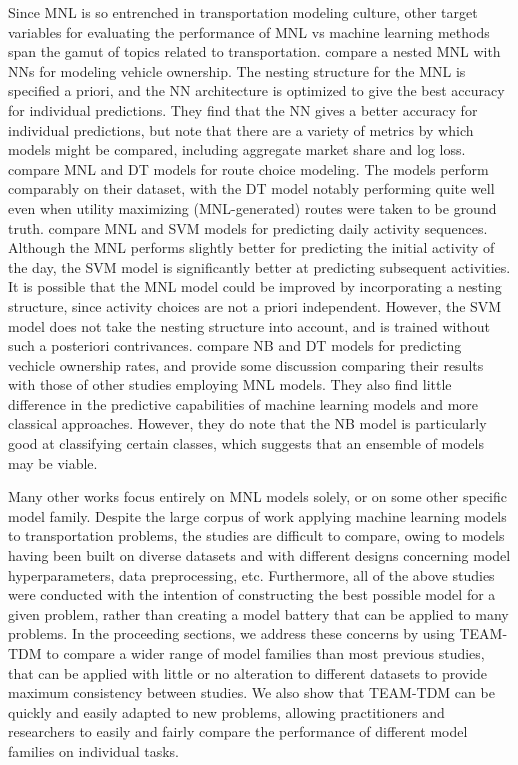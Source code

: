 \documentclass[conference]{IEEEtran}
\begin{document}
Since MNL is so entrenched in transportation modeling culture, other target variables for evaluating the performance of MNL vs machine learning methods span the gamut of topics related to transportation.
 \cite{mohammadian2002nested} compare a nested MNL with NNs for modeling vehicle ownership.
 The nesting structure for the MNL is specified a priori, and the NN architecture is optimized to give the best accuracy for individual predictions.
 They find that the NN gives a better accuracy for individual predictions, but note that there are a variety of metrics by which models might be compared, including aggregate market share and log loss.
 \cite{park2007learning} compare MNL and DT models for route choice modeling.
 The models perform comparably on their dataset, with the DT model notably performing quite well even when utility maximizing (MNL-generated) routes were taken to be ground truth.
 \cite{allahviranloo2013daily} compare MNL and SVM models for predicting daily activity sequences.
 Although the MNL performs slightly better for predicting the initial activity of the day, the SVM model is significantly better at predicting subsequent activities.
 It is possible that the MNL model could be improved by incorporating a nesting structure, since activity choices are not a priori independent.
 However, the SVM model does not take the nesting structure into account, and is trained without such a posteriori contrivances.
 \cite{clark2009determinants} compare NB and DT models for predicting vechicle ownership rates, and provide some discussion comparing their results with those of other studies employing MNL models.
 They also find little difference in the predictive capabilities of machine learning models and more classical approaches.
 However, they do note that the NB model is particularly good at classifying certain classes, which suggests that an ensemble of models may be viable.

Many other works focus entirely on MNL models solely, or on some other specific model family.
 Despite the large corpus of work applying machine learning models to transportation problems, the studies are difficult to compare, owing to models having been built on diverse datasets and with different designs concerning model hyperparameters, data preprocessing, etc.
 Furthermore, all of the above studies were conducted with the intention of constructing the best possible model for a given problem, rather than creating a model battery that can be applied to many problems.
 In the proceeding sections, we address these concerns by using TEAM-TDM to compare a wider range of model families than most previous studies, that can be applied with little or no alteration to different datasets to provide maximum consistency between studies.
 We also show that TEAM-TDM can be quickly and easily adapted to new problems, allowing practitioners and researchers to easily and fairly compare the performance of different model families on individual tasks.
\end{document}
